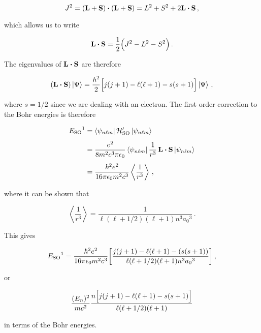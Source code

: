 \documentclass[12pt, titlepage]{article}
\newcommand{\exv}[1]{\left\langle #1 \right\rangle}
\begin{document}
\begin{equation}
	J^2 = (\vb{L}+\vb{S})\vdot(\vb{L}+\vb{S}) = L^2 + S^2 + 2\vb{L}\vdot\vb{S} \,,
\end{equation}

which allows us to write

\begin{equation}
	\vb{L}\vdot\vb{S} = \frac{1}{2}\Big(J^2 - L^2 - S^2\Bigr) \,.
\end{equation}

The eigenvalues of $\vb{L}\vdot\vb{S}$ are therefore

\begin{equation}
	(\vb{L}\vdot\vb{S})\ket{\Psi} = \frac{\hbar^2}{2}\Bigl[j(j+1) - \ell(\ell+1) - s(s+1)\Bigr]\ket{\Psi} \,,
\end{equation}

where $s=1/2$ since we are dealing with an electron. The first order correction to the Bohr energies is therefore

\begin{align*}
	{E_\text{SO}}^{1} &= \bra{\psi_{n\ell m}}\mathcal{H}_{\text{SO}}^\prime\ket{\psi_{n\ell m}} \\[4pt]
	&= \frac{e^2}{8m^2c^3\pi\epsilon_0}\bra{\psi_{n\ell m}}\frac{1}{r^3}\,\vb{L}\vdot\vb{S}\ket{\psi_{n\ell m}} \\[4pt]
	&= \frac{\hbar^2e^2}{16\pi\epsilon_0m^2c^3}\exv{\frac{1}{r^3}} \,,
\end{align*}

where it can be shown that

\begin{equation}
	\exv{\frac{1}{r^3}} = \frac{1}{\ell(\ell+1/2)(\ell+1)n^3{a_0}^3} \,.
\end{equation}

This gives

\begin{equation*}
	{E_\text{SO}}^{1} = \frac{\hbar^2e^2}{16\pi\epsilon_0m^2c^3}\qty[\frac{j(j+1)-\ell(\ell+1)-(s(s+1))}{\ell(\ell+1/2)(\ell+1)n^3{a_0}^3}] \,,
\end{equation*}

or

\begin{equation}
	\frac{(E_n)^2}{mc^2}\frac{n\Bigl[j(j+1) - \ell(\ell+1) - s(s+1)\Bigr]}{\ell(\ell+1/2)(\ell+1)} 
\end{equation}

in terms of the Bohr energies.
\end{document}
